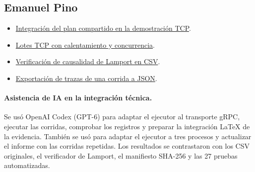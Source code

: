\subsection{Emanuel Pino}
\begin{itemize}
\item \href{https://github.com/BelindaTZ/GA-SUM-02-PE-U1/commit/14019f3}{Integración del plan compartido en la demostración TCP}.
\item \href{https://github.com/BelindaTZ/GA-SUM-02-PE-U1/commit/e2348ad}{Lotes TCP con calentamiento y concurrencia}.
\item \href{https://github.com/BelindaTZ/GA-SUM-02-PE-U1/commit/1c0eefc}{Verificación de causalidad de Lamport en CSV}.
\item \href{https://github.com/BelindaTZ/GA-SUM-02-PE-U1/commit/f732b14}{Exportación de trazas de una corrida a JSON}.
\end{itemize}

\paragraph{Asistencia de IA en la integración técnica.}
Se usó OpenAI Codex (GPT-6) para adaptar el ejecutor al transporte gRPC, ejecutar las corridas, comprobar los registros y preparar la integración LaTeX de la evidencia. También se usó para adaptar el ejecutor a tres procesos y actualizar el informe con las corridas repetidas. Los resultados se contrastaron con los CSV originales, el verificador de Lamport, el manifiesto SHA-256 y las 27 pruebas automatizadas.
